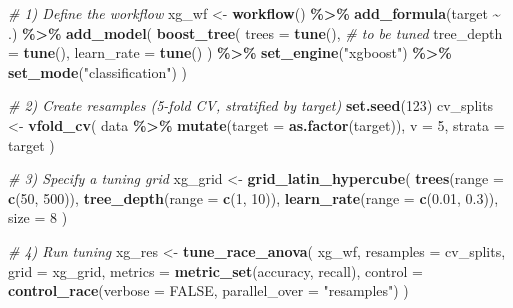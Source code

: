 \documentclass[
]{book}
\newenvironment{Shaded}{\begin{snugshade}}{\end{snugshade}}
\newcommand{\AttributeTok}[1]{\textcolor[rgb]{0.13,0.29,0.53}{#1}}
\newcommand{\CommentTok}[1]{\textcolor[rgb]{0.56,0.35,0.01}{\textit{#1}}}
\newcommand{\ConstantTok}[1]{\textcolor[rgb]{0.56,0.35,0.01}{#1}}
\newcommand{\DecValTok}[1]{\textcolor[rgb]{0.00,0.00,0.81}{#1}}
\newcommand{\FloatTok}[1]{\textcolor[rgb]{0.00,0.00,0.81}{#1}}
\newcommand{\FunctionTok}[1]{\textcolor[rgb]{0.13,0.29,0.53}{\textbf{#1}}}
\newcommand{\NormalTok}[1]{#1}
\newcommand{\OtherTok}[1]{\textcolor[rgb]{0.56,0.35,0.01}{#1}}
\newcommand{\SpecialCharTok}[1]{\textcolor[rgb]{0.81,0.36,0.00}{\textbf{#1}}}
\newcommand{\StringTok}[1]{\textcolor[rgb]{0.31,0.60,0.02}{#1}}
\begin{document}
\begin{Shaded}
\begin{Highlighting}[]
\CommentTok{\# 1) Define the workflow}
\NormalTok{xg\_wf }\OtherTok{\textless{}{-}} \FunctionTok{workflow}\NormalTok{() }\SpecialCharTok{\%\textgreater{}\%}
  \FunctionTok{add\_formula}\NormalTok{(target }\SpecialCharTok{\textasciitilde{}}\NormalTok{ .) }\SpecialCharTok{\%\textgreater{}\%} 
  \FunctionTok{add\_model}\NormalTok{(}
    \FunctionTok{boost\_tree}\NormalTok{(}
      \AttributeTok{trees      =} \FunctionTok{tune}\NormalTok{(),      }\CommentTok{\# to be tuned}
      \AttributeTok{tree\_depth =} \FunctionTok{tune}\NormalTok{(),}
      \AttributeTok{learn\_rate =} \FunctionTok{tune}\NormalTok{()}
\NormalTok{    ) }\SpecialCharTok{\%\textgreater{}\%} 
    \FunctionTok{set\_engine}\NormalTok{(}\StringTok{"xgboost"}\NormalTok{) }\SpecialCharTok{\%\textgreater{}\%} 
    \FunctionTok{set\_mode}\NormalTok{(}\StringTok{"classification"}\NormalTok{)}
\NormalTok{  )}

\CommentTok{\# 2) Create resamples (5{-}fold CV, stratified by target)}
\FunctionTok{set.seed}\NormalTok{(}\DecValTok{123}\NormalTok{)}
\NormalTok{cv\_splits }\OtherTok{\textless{}{-}} \FunctionTok{vfold\_cv}\NormalTok{(}
\NormalTok{  data }\SpecialCharTok{\%\textgreater{}\%} \FunctionTok{mutate}\NormalTok{(}\AttributeTok{target =} \FunctionTok{as.factor}\NormalTok{(target)),}
  \AttributeTok{v =} \DecValTok{5}\NormalTok{, }
  \AttributeTok{strata =}\NormalTok{ target}
\NormalTok{)}

\CommentTok{\# 3) Specify a tuning grid}
\NormalTok{xg\_grid }\OtherTok{\textless{}{-}} \FunctionTok{grid\_latin\_hypercube}\NormalTok{(}
  \FunctionTok{trees}\NormalTok{(}\AttributeTok{range =} \FunctionTok{c}\NormalTok{(}\DecValTok{50}\NormalTok{, }\DecValTok{500}\NormalTok{)),}
  \FunctionTok{tree\_depth}\NormalTok{(}\AttributeTok{range =} \FunctionTok{c}\NormalTok{(}\DecValTok{1}\NormalTok{, }\DecValTok{10}\NormalTok{)),}
  \FunctionTok{learn\_rate}\NormalTok{(}\AttributeTok{range =} \FunctionTok{c}\NormalTok{(}\FloatTok{0.01}\NormalTok{, }\FloatTok{0.3}\NormalTok{)),}
  \AttributeTok{size =} \DecValTok{8}
\NormalTok{)}

\CommentTok{\# 4) Run tuning}
\NormalTok{xg\_res }\OtherTok{\textless{}{-}} \FunctionTok{tune\_race\_anova}\NormalTok{(}
\NormalTok{  xg\_wf, }\AttributeTok{resamples =}\NormalTok{ cv\_splits, }\AttributeTok{grid =}\NormalTok{ xg\_grid,}
  \AttributeTok{metrics =} \FunctionTok{metric\_set}\NormalTok{(accuracy, recall),}
  \AttributeTok{control =} \FunctionTok{control\_race}\NormalTok{(}\AttributeTok{verbose =} \ConstantTok{FALSE}\NormalTok{, }\AttributeTok{parallel\_over =} \StringTok{"resamples"}\NormalTok{)}
\NormalTok{)}
\end{Highlighting}
\end{Shaded}
\end{document}
